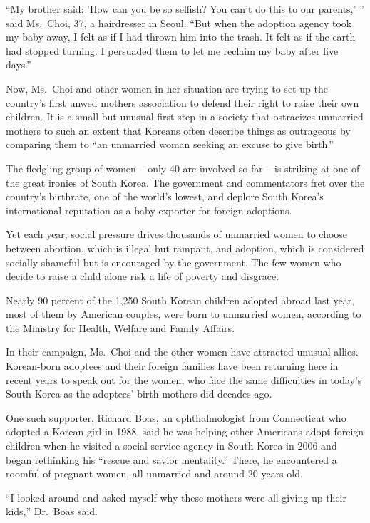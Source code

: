 ﻿\documentclass[12pt]{article}
\begin{document}
``My brother said: 'How can you be so selfish? You can't do this to our parents,' '' said Ms.~Choi,
37, a hairdresser in Seoul. ``But when the adoption agency took my baby away, I felt as if I had
thrown him into the trash. It felt as if the earth had stopped turning. I persuaded them to let me
reclaim my baby after five days.''

Now, Ms.~Choi and other women in her situation are trying to set up the country's first unwed
mothers association to defend their right to raise their own children. It is a small but unusual
first step in a society that ostracizes unmarried mothers to such an extent that Koreans often
describe things as outrageous by comparing them to ``an unmarried woman seeking an excuse to give
birth.''

The fledgling\cite{fledgling} group of women -- only 40 are involved so far -- is striking at one of
the great ironies of South Korea. The government and commentators fret over the country's birthrate,
one of the world's lowest, and deplore South Korea's international reputation as a baby exporter for
foreign adoptions.

Yet each year, social pressure drives thousands of unmarried women to choose between abortion, which
is illegal but rampant, and adoption, which is considered socially shameful but is encouraged by the
government. The few women who decide to raise a child alone risk a life of poverty and disgrace.

Nearly 90 percent of the 1,250 South Korean children adopted abroad last year, most of them by
American couples, were born to unmarried women, according to the Ministry for Health, Welfare and
Family Affairs.

In their campaign, Ms.~Choi and the other women have attracted unusual allies. Korean-born adoptees
and their foreign families have been returning here in recent years to speak out for the women, who
face the same difficulties in today's South Korea as the adoptees' birth mothers did decades ago.

One such supporter, Richard Boas, an ophthalmologist from Connecticut who adopted a Korean girl in
1988, said he was helping other Americans adopt foreign children when he visited a social service
agency in South Korea in 2006 and began rethinking his ``rescue and savior mentality.'' There, he
encountered a roomful of pregnant women, all unmarried and around 20 years old.

``I looked around and asked myself why these mothers were all giving up their kids,'' Dr.~Boas said.
\end{document}
